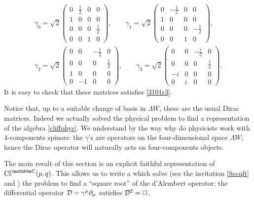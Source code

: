 \begin{equation}
\begin{split}
\gamma_0=\sqrt{2}\begin{pmatrix}
0 & \frac{1}{2} & 0 & 0 \\
1 & 0 & 0 & 0 \\
0 & 0 & 0 & \frac{1}{2} \\
0 & 0 & 1 & 0
\end{pmatrix}, \qquad
\gamma_1=\sqrt{2}\left(\begin{matrix}
0 & -\frac{1}{2} & 0 & 0 \\
1 & 0 & 0 & 0 \\
0 & 0 & 0 & -\frac{1}{2} \\
0 & 0 & 1 & 0
\end{matrix}\right),\\
\gamma_2=\sqrt{2}\begin{pmatrix}
0 & 0 & -\frac{1}{2} & 0 \\
0 & 0 & 0 & \frac{1}{2} \\
1 & 0 & 0 & 0 \\
0 & -1 & 0 & 0
\end{pmatrix},\qquad
\gamma_3=\sqrt{2}\begin{pmatrix}
0 & 0 & -\frac{i}{2} & 0 \\
0 & 0 & 0 & \frac{i}{2} \\
-i & 0 & 0 & 0 \\
0 & i & 0 & 0
\end{pmatrix}.
\end{split}
\end{equation}
It is easy to check that these matrices satisfies \eqref{3101r3}. 

Notice that, up to a suitable change of basis in $\Lambda W $, these are the usual Dirac matrices. Indeed we actually solved the physical problem to find a representation of the algebra \eqref{cliffphys}.  We understand by the way why do physicists work with $4$-components spinors: the $\gamma$'s are operators on the four-dimensional space $\Lambda W$; hence the Dirac operator will naturally acts on four-components objects.

The main result of this section is an explicit faithful representation of $\CCliff(p,q)$. This allows us to write a  which solve (see the invitation \ref{Secqft} and \cite{Bronn}) the problem  to find a ``square root'' of the d'Alembert operator: the differential operator $\mathcal{D}=\gamma^{\mu}\partial_{\mu}$ satisfies $\mathcal{D}^2=\Box$.

